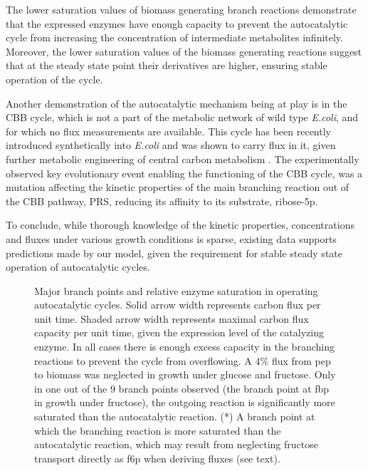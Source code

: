     The lower saturation values of biomass generating branch reactions demonstrate that the expressed enzymes have enough capacity to prevent the autocatalytic cycle from increasing the concentration of intermediate metabolites infinitely.
    Moreover, the lower saturation values of the biomass generating reactions suggest that at the steady state point their derivatives are higher, ensuring stable operation of the cycle.

    Another demonstration of the autocatalytic mechanism being at play is in the CBB cycle, which is not a part of the metabolic network of wild type \emph{E.coli}, and for which no flux measurements are available.
    This cycle has been recently introduced synthetically into \emph{E.coli} and was shown to carry flux in it, given further metabolic engineering of central carbon metabolism \cite{Antonovsky2016-jy}.
    The experimentally observed key evolutionary event enabling the functioning of the CBB cycle, was a mutation affecting the kinetic properties of the main branching reaction out of the CBB pathway, PRS, reducing its affinity to its substrate, ribose-5p.

    To conclude, while thorough knowledge of the kinetic properties, concentrations and fluxes under various growth conditions is sparse, existing data supports predictions made by our model, given the requirement for stable steady state operation of autocatalytic cycles.

\begin{figure}[h!]
\centering
\resizebox{1\linewidth}{!}{
    
}
\caption{
  Major branch points and relative enzyme saturation in operating autocatalytic cycles.
  Solid arrow width represents carbon flux per unit time.
  Shaded arrow width represents maximal carbon flux capacity per unit time, given the expression level of the catalyzing enzyme.
  In all cases there is enough excess capacity in the branching reactions to prevent the cycle from overflowing.
  A $4\%$ flux from pep to biomass was neglected in growth under glucose and fructose.
  Only in one out of the 9 branch points observed (the branch point at fbp in growth under fructose), the outgoing reaction is significantly more saturated than the autocatalytic reaction.
  (*) A branch point at which the branching reaction is more saturated than the autocatalytic reaction, which may result from neglecting fructose transport directly as f6p when deriving fluxes (see text).
}
    \label{fig:branch}
\end{figure}


